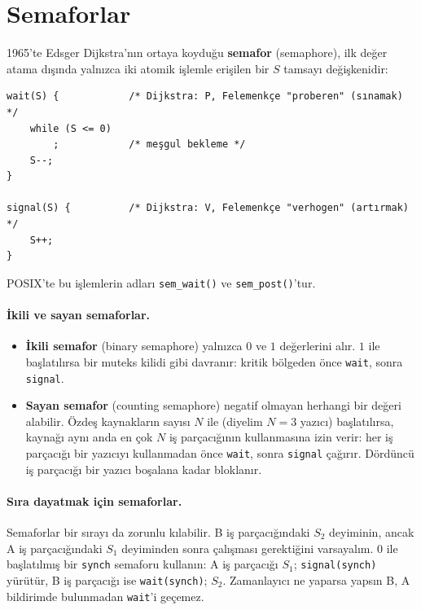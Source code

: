 \documentclass[11pt,a4paper]{article}
\newcommand{\term}[1]{\textbf{\color{mintdeep}#1}}
\newcommand{\cmd}[1]{\texttt{#1}}
\begin{document}
\section{Semaforlar}

1965'te Edsger Dijkstra'nın ortaya koyduğu \term{semafor} (semaphore), ilk değer atama dışında yalnızca iki atomik işlemle erişilen bir $S$ tamsayı değişkenidir:
\begin{lstlisting}
wait(S) {            /* Dijkstra: P, Felemenkçe "proberen" (sınamak) */
    while (S <= 0)
        ;            /* meşgul bekleme */
    S--;
}

signal(S) {          /* Dijkstra: V, Felemenkçe "verhogen" (artırmak) */
    S++;
}
\end{lstlisting}
POSIX'te bu işlemlerin adları \cmd{sem\_wait()} ve \cmd{sem\_post()}'tur.

\paragraph{İkili ve sayan semaforlar.}
\begin{itemize}
  \item \textbf{İkili semafor} (binary semaphore) yalnızca $0$ ve $1$ değerlerini alır. $1$ ile başlatılırsa bir muteks kilidi gibi davranır: kritik bölgeden önce \texttt{wait}, sonra \texttt{signal}.
  \item \textbf{Sayan semafor} (counting semaphore) negatif olmayan herhangi bir değeri alabilir. Özdeş kaynakların sayısı $N$ ile (diyelim $N=3$ yazıcı) başlatılırsa, kaynağı aynı anda en çok $N$ iş parçacığının kullanmasına izin verir: her iş parçacığı bir yazıcıyı kullanmadan önce \texttt{wait}, sonra \texttt{signal} çağırır. Dördüncü iş parçacığı bir yazıcı boşalana kadar bloklanır.
\end{itemize}

\paragraph{Sıra dayatmak için semaforlar.} Semaforlar bir sırayı da zorunlu kılabilir. B iş parçacığındaki $S_2$ deyiminin, ancak A iş parçacığındaki $S_1$ deyiminden sonra çalışması gerektiğini varsayalım. $0$ ile başlatılmış bir \texttt{synch} semaforu kullanın: A iş parçacığı $S_1$; \texttt{signal(synch)} yürütür, B iş parçacığı ise \texttt{wait(synch)}; $S_2$. Zamanlayıcı ne yaparsa yapsın B, A bildirimde bulunmadan \texttt{wait}'i geçemez.
\end{document}
